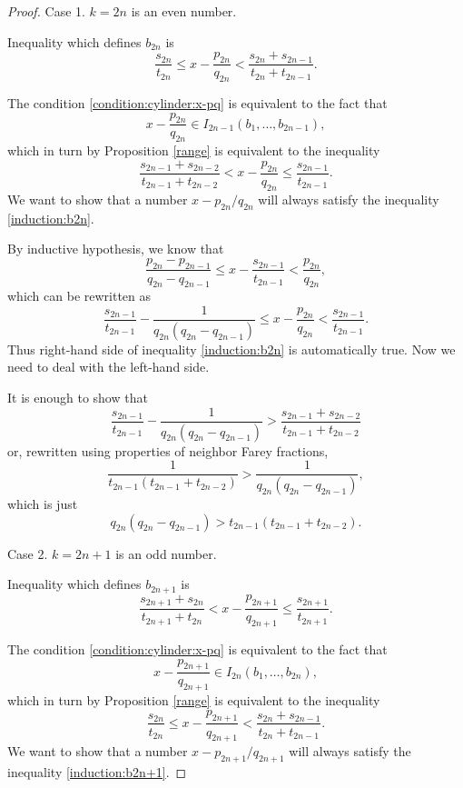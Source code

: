 \documentclass[10pt,a4paper]{amsart}
\begin{document}
\begin{proof}
Case 1. $k=2n$ is an even number. 

Inequality which defines $b_{2n}$ is 
\begin{equation}\label{deff:b2n}
\frac{s_{2n}}{t_{2n}} \leq x - \frac{p_{2n}}{q_{2n}} < \frac{s_{2n}+s_{2n-1}}{t_{2n}+t_{2n-1}}.
\end{equation}

The condition \eqref{condition:cylinder:x-pq} is equivalent to the fact that 
$$
x-\frac{p_{2n}}{q_{2n}} \in I_{2n-1}(b_1,\ldots,b_{2n-1}),
$$
which in turn by Proposition \ref{range} is equivalent to the inequality
\begin{equation}\label{induction:b2n}
\frac{s_{2n-1}+s_{2n-2}}{t_{2n-1}+t_{2n-2}} < x - \frac{p_{2n}}{q_{2n}} \leq \frac{s_{2n-1}}{t_{2n-1}}.
\end{equation}
We want to show that a number $x-p_{2n}/q_{2n}$ will always satisfy the inequality \eqref{induction:b2n}.

By inductive hypothesis, we know that
$$
\frac{p_{2n}-p_{2n-1}}{q_{2n}-q_{2n-1}} \leq x - \frac{s_{2n-1}}{t_{2n-1}} < \frac{p_{2n}}{q_{2n}},
$$
which can be rewritten as 
$$
\frac{s_{2n-1}}{t_{2n-1}} - \frac{1}{q_{2n}(q_{2n}-q_{2n-1})} \leq x - \frac{p_{2n}}{q_{2n}} < \frac{s_{2n-1}}{t_{2n-1}}.
$$
Thus right-hand side of inequality \eqref{induction:b2n} is automatically true. Now we need to deal with the left-hand side.

It is enough to show that
$$
\frac{s_{2n-1}}{t_{2n-1}} - \frac{1}{q_{2n}(q_{2n}-q_{2n-1})} > \frac{s_{2n-1}+s_{2n-2}}{t_{2n-1}+t_{2n-2}}
$$
or, rewritten using properties of neighbor Farey fractions,
\begin{equation}
\frac{1}{t_{2n-1}(t_{2n-1}+t_{2n-2})} > \frac{1}{q_{2n}(q_{2n}-q_{2n-1})},
\end{equation}
which is just
\begin{equation}\label{induction:b2n:final}
q_{2n}(q_{2n}-q_{2n-1}) >t_{2n-1}(t_{2n-1}+t_{2n-2}).
\end{equation}


Case 2.  $k=2n+1$ is an odd number. 

Inequality which defines $b_{2n+1}$ is 
\begin{equation}\label{deff:b2n+1}
\frac{s_{2n+1}+s_{2n}}{t_{2n+1}+t_{2n}} < x - \frac{p_{2n+1}}{q_{2n+1}} \leq    \frac{s_{2n+1}}{t_{2n+1}}.
\end{equation}

The condition \eqref{condition:cylinder:x-pq} is equivalent to the fact that 
$$
x-\frac{p_{2n+1}}{q_{2n+1}} \in I_{2n}(b_1,\ldots,b_{2n}),
$$
which in turn by Proposition \ref{range} is equivalent to the inequality
\begin{equation}\label{induction:b2n+1}
\frac{s_{2n}}{t_{2n}}   \leq x - \frac{p_{2n+1}}{q_{2n+1}} < \frac{s_{2n}+s_{2n-1}}{t_{2n}+t_{2n-1}}.
\end{equation}
We want to show that a number $x-p_{2n+1}/q_{2n+1}$ will always satisfy the inequality \eqref{induction:b2n+1}.


\end{proof}
\end{document}
